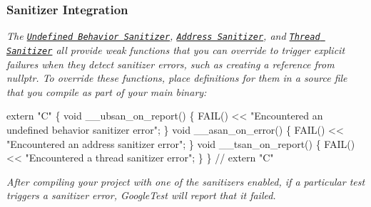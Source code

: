 {\itshape \subsubsection*{Sanitizer Integration}}

{\itshape }

{\itshape The \href{https://clang.llvm.org/docs/UndefinedBehaviorSanitizer.html}{\tt Undefined Behavior Sanitizer}, \href{https://github.com/google/sanitizers/wiki/AddressSanitizer}{\tt Address Sanitizer}, and \href{https://github.com/google/sanitizers/wiki/ThreadSanitizerCppManual}{\tt Thread Sanitizer} all provide weak functions that you can override to trigger explicit failures when they detect sanitizer errors, such as creating a reference from {\ttfamily nullptr}. To override these functions, place definitions for them in a source file that you compile as part of your main binary\+:}

{\itshape 
\begin{DoxyCode}
extern "C" \{
void \_\_ubsan\_on\_report() \{
  FAIL() << "Encountered an undefined behavior sanitizer error";
\}
void \_\_asan\_on\_error() \{
  FAIL() << "Encountered an address sanitizer error";
\}
void \_\_tsan\_on\_report() \{
  FAIL() << "Encountered a thread sanitizer error";
\}
\}  // extern "C"
\end{DoxyCode}
}

{\itshape After compiling your project with one of the sanitizers enabled, if a particular test triggers a sanitizer error, Google\+Test will report that it failed. }